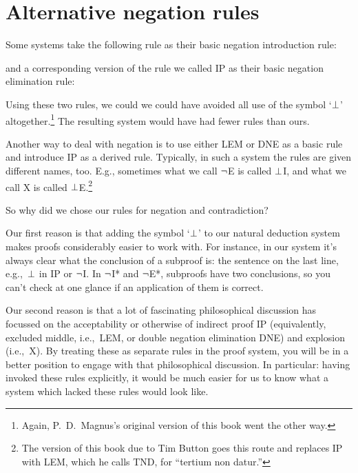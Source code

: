 \section{Alternative negation rules}
Some systems take the following rule as their basic negation introduction rule:
\begin{fitchproof}
	\open
		\AS
	\close
\end{fitchproof}
and a corresponding version of the rule we called IP as their basic negation elimination rule:
\begin{fitchproof}
	\open
		 \AS
	\close
\end{fitchproof}
Using these two rules, we could we could have avoided all use of the symbol `$\bot$' altogether.\footnote{Again, P.~D.\ Magnus's original version of this book went the other way.} The resulting system would have had fewer rules than ours.

Another way to deal with negation is to use either LEM or DNE as a basic rule and introduce IP as a derived rule. Typically, in such a system the rules are given different names, too. E.g., sometimes what we call $\neg$E is called $\bot$I, and what we call X is called $\bot$E.\footnote{The version of this book due to Tim Button goes this route and replaces IP with LEM, which he calls TND, for ``tertium non datur.''}

So why did we chose our rules for negation and contradiction? 

Our first reason is that adding the symbol `$\bot$' to our natural deduction system makes proofs considerably easier to work with. For instance, in our system it's always clear what the conclusion of a subproof is: the sentence on the last line, e.g.,\ $\bot$ in IP or $\neg$I. In $\neg$I* and $\neg$E*, subproofs have two conclusions, so you can't check at one glance if an application of them is correct.

Our second reason is that a lot of fascinating philosophical discussion has focussed on the acceptability or otherwise of indirect proof IP (equivalently, excluded middle, i.e.,\ LEM, or double negation elimination DNE) and explosion (i.e.,\ X). By treating these as separate rules in the proof system, you will be  in a better position to engage with that philosophical discussion. In particular: having invoked these rules explicitly, it would be much easier for us to know what a system which lacked these rules would look like.

